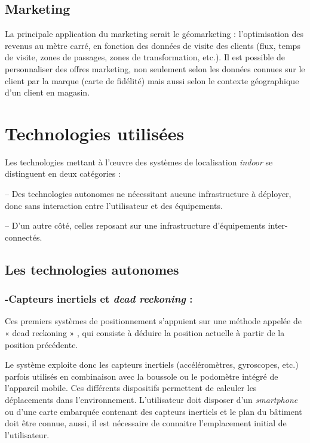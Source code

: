 \documentclass[12pt,a4paper]{report}
\begin{document}
\subsection{Marketing}

La principale application du marketing serait le géomarketing : l’optimisation des revenus au mètre carré, en fonction des données de visite des clients (flux, temps de visite, zones de passages, zones de transformation, etc.). Il est possible de personnaliser des offres marketing, non seulement selon les données connues sur le client par la marque (carte de fidélité) mais aussi selon le contexte géographique d’un client en magasin.


\section{Technologies utilisées}

Les technologies mettant à l’œuvre des systèmes de localisation \textit{indoor} se distinguent en deux catégories :


– Des technologies autonomes ne nécessitant aucune infrastructure à déployer, donc sans interaction entre l’utilisateur et des équipements.


– D’un autre côté, celles reposant sur une infrastructure d’équipements inter-connectés.

\subsection{Les technologies autonomes}

\subsubsection{-Capteurs inertiels et \textit{dead reckoning} :}


	Ces premiers systèmes de positionnement s’appuient sur une méthode appelée de « dead reckoning »\cite{dead} , qui consiste à déduire la position actuelle à partir de la position précédente.
	
	Le système exploite donc les capteurs inertiels (accéléromètres, gyroscopes, etc.) parfois utilisés en combinaison avec la boussole ou le podomètre intégré de l’appareil mobile. Ces différents dispositifs permettent de calculer les déplacements dans l’environnement. L’utilisateur doit disposer d’un \textit{smartphone} ou d’une carte embarquée contenant des capteurs inertiels et le plan du bâtiment doit être connue, aussi, il est nécessaire de connaitre l’emplacement initial de l’utilisateur.
	
\end{document}

